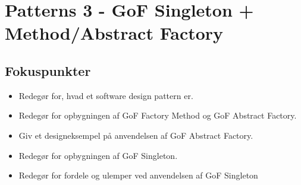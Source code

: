 \section{Patterns 3 - GoF Singleton + Method/Abstract Factory}

\subsection{Fokuspunkter}

\begin{itemize}
	\item Redegør for, hvad et software design pattern er.
	\item Redegør for opbygningen af GoF Factory Method og GoF Abstract Factory.
	\item Giv et designeksempel på anvendelsen af GoF Abstract Factory.
	\item Redegør for opbygningen af GoF Singleton.
	\item Redegør for fordele og ulemper ved anvendelsen af GoF Singleton
\end{itemize}